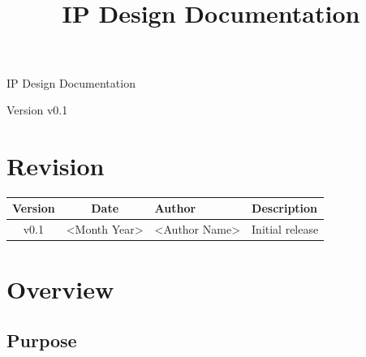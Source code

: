 \documentclass[10pt,a4paper]{article}
\title{
    \vspace{-20mm}
    \textbf{\IPName}\\[2mm]
    \large IP Design Documentation
}
\author{\IPAuthor}
\date{\IPDate}
\newcommand{\IPName}{<IP Name>}
\newcommand{\IPVersion}{v0.1}
\newcommand{\IPAuthor}{<Author Name>}
\newcommand{\IPDate}{<Month Year>}
\begin{document}

\begin{titlepage}
\centering
\vspace*{\fill}
{\Huge\bfseries \IPName\par}\vspace{8mm}
{\Large IP Design Documentation\par}\vspace{15mm}
{\large Version \IPVersion\par}\vspace{3mm}
{\large\IPAuthor\par}\vspace{3mm}
{\large \IPDate\par}\vspace*{\fill}

\end{titlepage}

\section{Revision}

\begin{table}[H]
\centering
\begin{tabularx}{\textwidth}{c c l X}
\toprule
\textbf{Version} & \textbf{Date} & \textbf{Author} & \textbf{Description} \\
\midrule
v0.1 & <Month Year> & <Author Name> & Initial release \\
\bottomrule
\end{tabularx}
\end{table}

\section{Overview}

\subsection{Purpose}
\end{document}
